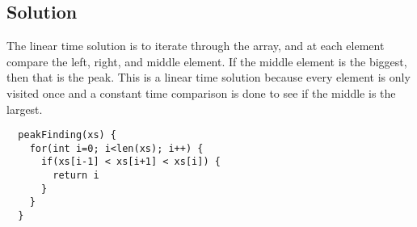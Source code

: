 \subsection*{Solution}
The linear time solution is to iterate through the array, and at each element compare the left, right, and middle element. If the middle element is the biggest, then that is the peak. This is a linear time solution because every element is only visited once and a constant time comparison is done to see if the middle is the largest.

\begin{verbatim}
  peakFinding(xs) {
    for(int i=0; i<len(xs); i++) {
      if(xs[i-1] < xs[i+1] < xs[i]) {
        return i
      }
    }
  }
\end{verbatim}
